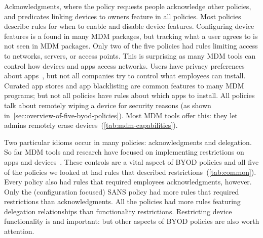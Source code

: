 \documentclass[thesis.tex]{subfiles}
\begin{document}
Acknowledgments, where the policy requests people acknowledge other
policies, and predicates linking devices to owners feature in all
policies.  Most policies describe rules for when to enable and disable
device features.  Configuring device features is a found in
many \ac{MDM} packages, but tracking what a user agrees to is not seen
in \ac{MDM} packages.  Only two of the five policies had
rules limiting access to networks, servers, or access points. This is
surprising as many \ac{MDM} tools can control how
devices and apps access networks.  Users have privacy preferences
about apps~\cite{lin_modeling_2014}, but not all companies try to
control what employees can install.  Curated app stores and
app blacklisting are common features to many \ac{MDM} programs; but not
all policies have rules about which apps to install.  All
policies talk about remotely wiping a device for security reasons
(as shown in~\autoref{sec:overview-of-five-byod-policies}). Most
\ac{MDM} tools offer this: they let admins
remotely erase devices~(\autoref{tab:mdm-capabilities}).

Two particular idioms occur in many policies: acknowledgments and
delegation.  So far MDM tools and research have
focused on implementing restrictions on apps and
devices~\cite{ibm_ibm_nodate,armando_formal_2014,martinelli_enhancing_2016}.
These controls are a vital aspect of BYOD policies and all
five of the policies we looked at had rules that described
restrictions~(\autoref{tab:common}).  Every policy also had
rules that required employees acknowledgments, however.  Only the
(configuration focused) SANS policy had more rules
that required restrictions than acknowledgments.  All the policies
had more rules featuring delegation relationships than
functionality restrictions.  Restricting device functionality is
and important: but other aspects of BYOD policies are also
worth attention.
\end{document}
